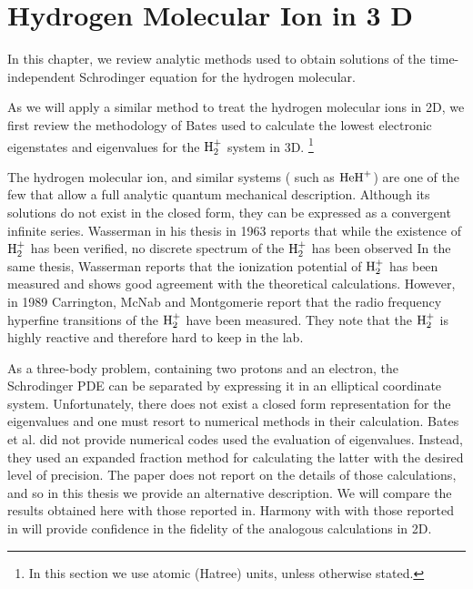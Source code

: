 \chapter{Hydrogen Molecular Ion in 3 D }

In this chapter, we review analytic methods\cite{Bates1,Bates2,Slater} used to obtain 
solutions of the time-independent Schrodinger equation for 
the hydrogen molecular.

As we will apply a similar method to treat the hydrogen molecular ions in 2D,
we first review the methodology of Bates used to calculate the lowest electronic eigenstates and eigenvalues for the $ {\rm H}_2^{+} $ system in 3D. \footnote {In this section we
use atomic (Hatree) units, unless otherwise stated.}

The hydrogen molecular ion, and similar systems ( such as $ {\rm HeH}^{+} $) are one of the few that allow a full analytic quantum mechanical description. Although its
solutions do not exist in the closed form, they can be expressed as a convergent infinite series.  Wasserman in his thesis \cite{ExperimentalBates2} in 1963 reports that while the existence of $ {\rm H}_2^{+} $ has been verified, no  discrete spectrum of the  $ {\rm H}_2^{+} $ has been observed  In the same thesis, Wasserman reports that the ionization potential of $ {\rm H}_2^{+} $ has been measured and shows good agreement with the theoretical calculations. However, in 1989 Carrington, McNab and Montgomerie report \cite{ExperimentalBates3} that the radio frequency hyperfine transitions of the $ {\rm H}_2^{+} $ have been measured. They note that the $ {\rm H}_2^{+} $  is highly reactive and therefore hard to keep in the lab.

As a three-body problem, containing two protons and an electron,
the Schrodinger PDE can be separated by expressing it in an elliptical coordinate system. Unfortunately, there does not exist a closed form representation for the eigenvalues and one must resort to numerical methods in their calculation.
Bates et al. \cite{Bates1}\cite{Bates2} did not provide numerical codes used the evaluation of eigenvalues. Instead, they used an expanded fraction method for calculating the latter with the desired level of precision. The paper\cite{Bates2} does not report on the details of those calculations, and so in this thesis we provide an alternative description. We will compare
 the results obtained here with those reported in\cite{Bates2}. Harmony with with those reported in\cite{Bates2} will provide 
 confidence in the fidelity of the analogous calculations in 2D.

